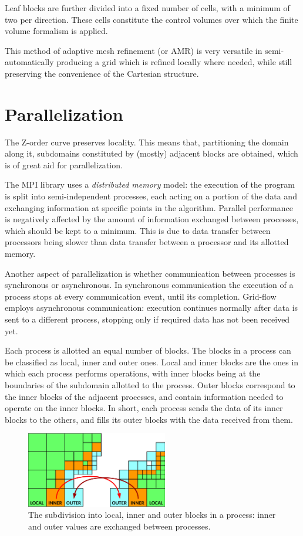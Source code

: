 \documentclass[11pt, a4paper, oneside, openany]{book}
\begin{document}
Leaf blocks are further divided into a fixed number of cells, with a minimum of two per direction. These cells constitute the control volumes over which the finite volume formalism is applied.\par
This method of adaptive mesh refinement (or AMR) is very versatile in semi-automatically producing a grid which is refined locally where needed, while still preserving the convenience of the Cartesian structure.
\section{Parallelization}
The Z-order curve preserves locality. This means that, partitioning the domain along it, subdomains constituted by (mostly) adjacent blocks are obtained, which is of great aid for parallelization.\par
The MPI library uses a \textit{distributed memory} model: the execution of the program is split into semi-independent processes, each acting on a portion of the data and exchanging information at specific points in the algorithm. Parallel performance is negatively affected by the amount of information exchanged between processes, which should be kept to a minimum. This is due to data transfer between processors being slower than data transfer between a processor and its allotted memory.\par
Another aspect of parallelization is whether communication between processes is synchronous or asynchronous. In synchronous communication the execution of a process stops at every communication event, until its completion. Grid-flow employs asynchronous communication: execution continues normally after data is sent to a different process, stopping only if required data has not been received yet.\par
Each process is allotted an equal number of blocks. The blocks in a process can be classified as local, inner and outer ones. Local and inner blocks are the ones in which each process performs operations, with inner blocks being at the boundaries of the subdomain allotted to the process. Outer blocks correspond to the inner blocks of the adjacent processes, and contain information needed to operate on the inner blocks. In short, each process sends the data of its inner blocks to the others, and fills its outer blocks with the data received from them.
\begin{figure}[!ht]
	\centering
	\includegraphics[width=0.55\textwidth]{LocalInnerOuter.pdf}
	\caption[Local, Inner and Outer Blocks]{The subdivision into local, inner and outer blocks in a process: inner and outer values are exchanged between processes.}
	\label{LocalInnerOuter}
\end{figure}\noindent
\end{document}
